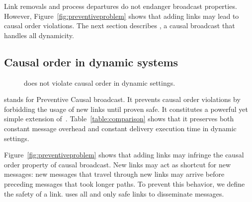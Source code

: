 Link removals and process departures do not endanger broadcast properties.
However, Figure~\ref{fig:preventiveproblem} shows that adding links may lead to
causal order violations. The next section describes \CBROADCAST, a causal
broadcast that handles all dynamicity.

\subsection{Causal order in dynamic systems}

\begin{figure*}
  \begin{center}
    \hspace{20pt}
    \hspace{20pt}
    \hspace{20pt}
    \hspace{20pt}
    \caption{\label{fig:preventivesolve}\CBROADCAST does not violate causal
      order in dynamic settings.}
  \end{center}
\end{figure*}


\CBROADCAST stands for Preventive Causal broadcast. It prevents causal order
violations by forbidding the usage of new links until proven safe. It
constitutes a powerful yet simple extension
of~\cite{friedman2004causal}. Table~\ref{table:comparison} shows that it
preserves both constant message overhead and constant delivery execution time in
dynamic settings.

Figure~\ref{fig:preventiveproblem} shows that adding links may infringe the
causal order property of causal broadcast.  New links may act as shortcut for
new messages: new messages that travel through new links may arrive before
preceding messages that took longer paths. To prevent this behavior, we define
the safety of a link. \CBROADCAST uses all and only safe links to disseminate
messages.

